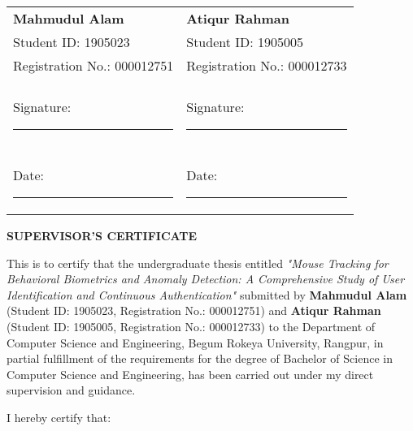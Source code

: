 \documentclass[
  11pt,
  a4paper,
]{article}
\begin{document}
\vspace*{3cm}

\begin{tabular}{p{6cm} p{6cm}}
\textbf{Mahmudul Alam} & \textbf{Atiqur Rahman} \\
Student ID: 1905023 & Student ID: 1905005 \\
Registration No.: 000012751 & Registration No.: 000012733 \\
& \\
Signature: \rule{4cm}{0.5pt} & Signature: \rule{4cm}{0.5pt} \\
& \\
Date: \rule{3cm}{0.5pt} & Date: \rule{3cm}{0.5pt} \\
\end{tabular}

\newpage

\newpage
\thispagestyle{plain}

\begin{center}
\vspace*{2cm}
\textbf{\Large SUPERVISOR'S CERTIFICATE}
\end{center}

\vspace*{2cm}

This is to certify that the undergraduate thesis entitled
\textit{"Mouse Tracking for Behavioral Biometrics and Anomaly Detection: A Comprehensive Study of User Identification and Continuous Authentication"}
submitted by \textbf{Mahmudul Alam} (Student ID: 1905023, Registration
No.: 000012751) and \textbf{Atiqur Rahman} (Student ID: 1905005,
Registration No.: 000012733) to the Department of Computer Science and
Engineering, Begum Rokeya University, Rangpur, in partial fulfillment of
the requirements for the degree of Bachelor of Science in Computer
Science and Engineering, has been carried out under my direct
supervision and guidance.

I hereby certify that:
\end{document}
